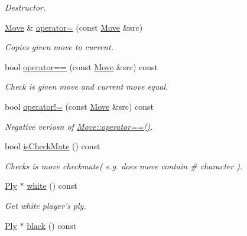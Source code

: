 \begin{DoxyCompactItemize}
\begin{DoxyCompactList}\small\item\em Destructor. \item\end{DoxyCompactList}\item 
\hyperlink{classpgn_1_1Move}{Move} \& \hyperlink{classpgn_1_1Move_a13eaa8cab0874d6f5c30017c179ca608}{operator=} (const \hyperlink{classpgn_1_1Move}{Move} \&src)
\begin{DoxyCompactList}\small\item\em Copies given move to current. \item\end{DoxyCompactList}\item 
bool \hyperlink{classpgn_1_1Move_ab29d7ad0a246c58f53840c30163ff932}{operator==} (const \hyperlink{classpgn_1_1Move}{Move} \&src) const 
\begin{DoxyCompactList}\small\item\em Check is given move and current move equal. \item\end{DoxyCompactList}\item 
bool \hyperlink{classpgn_1_1Move_a59795e9c42731f979271d86546c254aa}{operator!=} (const \hyperlink{classpgn_1_1Move}{Move} \&src) const 
\begin{DoxyCompactList}\small\item\em Negative veriosn of \hyperlink{classpgn_1_1Move_ab29d7ad0a246c58f53840c30163ff932}{Move::operator==()}. \item\end{DoxyCompactList}\item 
bool \hyperlink{classpgn_1_1Move_ad15aa895b133bf43304b147bc3db9e5d}{isCheckMate} () const 
\begin{DoxyCompactList}\small\item\em Checks is move checkmate( e.g. does move contain \# character ). \item\end{DoxyCompactList}\item 
\hyperlink{classpgn_1_1Ply}{Ply} $\ast$ \hyperlink{classpgn_1_1Move_a0321dd73f271684cf7040bb61c1934e3}{white} () const 
\begin{DoxyCompactList}\small\item\em Get white player's ply. \item\end{DoxyCompactList}\item 
\hyperlink{classpgn_1_1Ply}{Ply} $\ast$ \hyperlink{classpgn_1_1Move_a112464932b1bf070ef1c465fadb9c4b1}{black} () const 

\end{DoxyCompactItemize}
